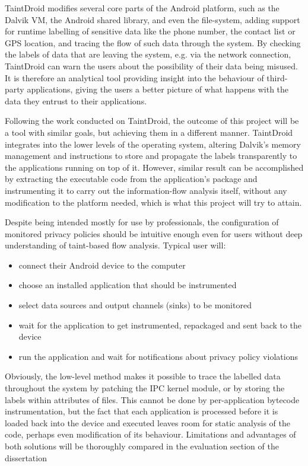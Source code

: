 \documentclass[12pt]{article}
\begin{document}
TaintDroid modifies several core parts of the Android platform, such as 
the Dalvik VM, the Android shared library, and even the file-system, 
adding support for runtime labelling of sensitive data like the phone number, 
the contact list or GPS location, and tracing the flow of such data through 
the system. By checking the labels of data that are leaving the system, e.g. 
via the network connection, TaintDroid can warn the users about the 
possibility of their data being misused. It is therefore an analytical tool 
providing insight into the behaviour of third-party applications, giving the 
users a better picture of what happens with the data they entrust to their 
applications.

Following the work conducted on TaintDroid, the outcome of this project 
will be a tool with similar goals, but achieving them in a different 
manner. TaintDroid integrates into the lower levels of the operating 
system, altering Dalvik's memory management and instructions to store and
propagate the labels transparently to the applications running on top of 
it. However, similar result can be accomplished by extracting the 
executable code from the application's package and instrumenting it to 
carry out the information-flow analysis itself, without any modification 
to the platform needed, which is what this project will try to attain.

Despite being intended mostly for use by professionals, the configuration 
of monitored privacy policies should be intuitive enough even for users 
without deep understanding of taint-based flow analysis. Typical user will:
\begin{itemize}
\item{connect their Android device to the computer}
\item{choose an installed application that should be instrumented}
\item{select data sources and output channels (sinks) to be monitored}
\item{wait for the application to get instrumented, repackaged and sent
      back to the device}
\item{run the application and wait for notifications about privacy policy
      violations}
\end{itemize}

Obviously, the low-level method makes it possible to trace the labelled data 
throughout the system by patching the IPC kernel module, or by storing the 
labels within attributes of files. This cannot be done by per-application 
bytecode instrumentation, but the fact that each application is processed 
before it is loaded back into the device and executed leaves room for static 
analysis of the code, perhaps even modification of its behaviour. Limitations 
and advantages of both solutions will be thoroughly compared in the evaluation 
section of the dissertation
\end{document}
